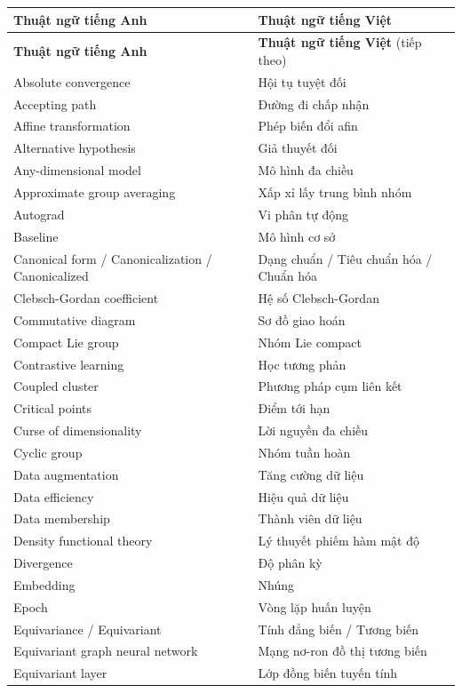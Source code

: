 \documentclass[oneside]{hcmus-report}
\theoremstyle{plain}
\theoremstyle{definition}
\begin{document}
\begin{longtable}{p{} p{}}
\textbf{Thuật ngữ tiếng Anh} & \textbf{Thuật ngữ tiếng Việt} \\
\hline
\endfirsthead
\textbf{Thuật ngữ tiếng Anh} & \textbf{Thuật ngữ tiếng Việt} (tiếp theo) \\
\hline
\endhead

Absolute convergence & Hội tụ tuyệt đối \\
Accepting path & Đường đi chấp nhận \\
Affine transformation & Phép biến đổi afin \\
Alternative hypothesis & Giả thuyết đối \\
Any-dimensional model & Mô hình đa chiều \\
Approximate group averaging & Xấp xỉ lấy trung bình nhóm \\
Autograd & Vi phân tự động \\
Baseline & Mô hình cơ sở \\
Canonical form / Canonicalization / Canonicalized & Dạng chuẩn / Tiêu chuẩn hóa / Chuẩn hóa \\
Clebsch-Gordan coefficient & Hệ số Clebsch-Gordan \\
Commutative diagram & Sơ đồ giao hoán \\
Compact Lie group & Nhóm Lie compact \\
Contrastive learning & Học tương phản \\
Coupled cluster & Phương pháp cụm liên kết \\
Critical points & Điểm tới hạn \\
Curse of dimensionality & Lời nguyền đa chiều \\
Cyclic group & Nhóm tuần hoàn \\
Data augmentation & Tăng cường dữ liệu \\
Data efficiency & Hiệu quả dữ liệu \\
Data membership & Thành viên dữ liệu \\
Density functional theory & Lý thuyết phiếm hàm mật độ \\
Divergence & Độ phân kỳ \\
Embedding & Nhúng \\
Epoch & Vòng lặp huấn luyện \\
Equivariance / Equivariant & Tính đẳng biến / Tương biến \\
Equivariant graph neural network & Mạng nơ-ron đồ thị tương biến \\
Equivariant layer & Lớp đồng biến tuyến tính \\

\end{longtable}
\end{document}
